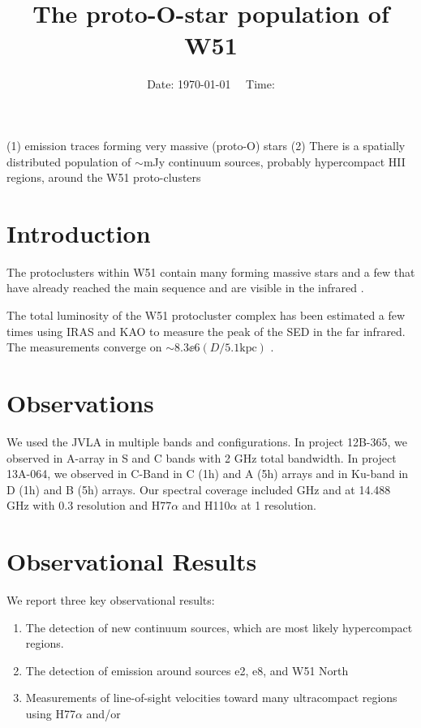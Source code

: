 



\title{The proto-O-star population of W51}


\date{Date: \today ~~ Time: \currenttime}

\abstract
{}
{}
{}
{}
{
(1) \ortho \twotwo emission traces forming very massive (proto-O) stars
(2) There is a spatially distributed population of $\sim$mJy continuum sources,
probably hypercompact HII regions, around the W51 proto-clusters
}

\maketitle


\section{Introduction}

The protoclusters within W51 contain many forming massive stars
\citep{Zhang1997a,Keto2008b,Zapata2008a,Zapata2009a,Zapata2010a,Goddi2015a,Shi2010a,Shi2010b}
and a few that have already reached the main sequence and are visible in the
infrared \citep{Barbosa2008a,Figueredo2008a}.

The total luminosity of the W51 protocluster complex has been estimated a few
times using IRAS and KAO to measure the peak of the SED in the far infrared.
The measurements converge on $\sim8.3\ee{6} (D/5.1\mathrm{kpc})$ \lsun
\citep{Harvey1986a,Sievers1991a}.

\section{Observations}
We used the JVLA in multiple bands and configurations.  In project 12B-365, we
observed in A-array in S and C bands with 2 GHz total bandwidth.  In project
13A-064, we observed in C-Band in C (1h) and A (5h) arrays and in Ku-band in D
(1h) and B (5h) arrays.  Our spectral coverage included \ortho {} GHz
and \twotwo at 14.488 GHz with 0.3 \kms resolution and H77$\alpha$ and H110$\alpha$
at 1 \kms resolution.

\section{Observational Results}
We report three key observational results: 
\begin{enumerate}
    \item The detection of new continuum sources, which are most likely
        hypercompact \hii regions.
    \item The detection of \formaldehyde \twotwo emission around sources e2,
        e8, and W51 North
    \item Measurements of line-of-sight velocities toward many ultracompact
        \hii regions using H77$\alpha$ and/or \formaldehyde
\end{enumerate}


